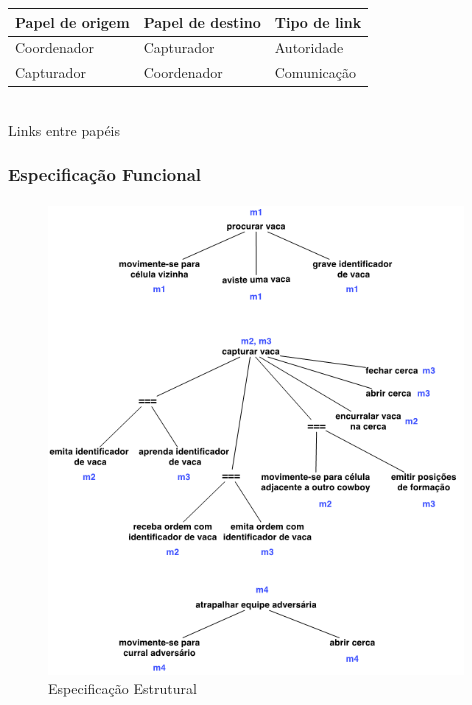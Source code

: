 \documentclass{llncs}
\begin{document}
\begin{center}
\begin{tabular}{|l|l|l|}
\hline
\rowcolor[gray]{0.8} \textbf{Papel de origem}		&\textbf{Papel de destino} 	& \textbf{Tipo de link}\\
\hline
Coordenador	&Capturador	&Autoridade \\
\hline
Capturador	&Coordenador	&Comunicação \\
\hline
\end{tabular}
\\ Links entre papéis
\end{center}

\newpage

\subsubsection{Especificação Funcional}

\paragraph{ }

\begin{figure}[!ht]
\centering 
\includegraphics[width=11cm]{images/functionalspec.png}
\caption{Especificação Estrutural}
\end{figure}


\end{document}
